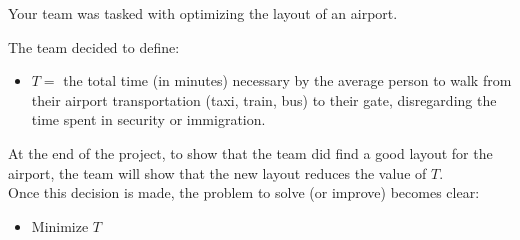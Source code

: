 \begin{example}
	Your team was tasked with optimizing the layout of an airport. 

	The team decided to define:
	\begin{itemize}
		\item $T = $ the total time (in minutes) necessary by the average person to walk from their airport transportation (taxi, train, bus) to their gate, disregarding the time spent in security or immigration.
	\end{itemize}

	At the end of the project, to show that the team did find a good layout for the airport, the team will show that the new layout reduces the value of $T$. \\

	Once this decision is made, the problem to solve (or improve) becomes clear:
	
	\begin{itemize}
		\item Minimize $T$
	\end{itemize}


\end{example}
